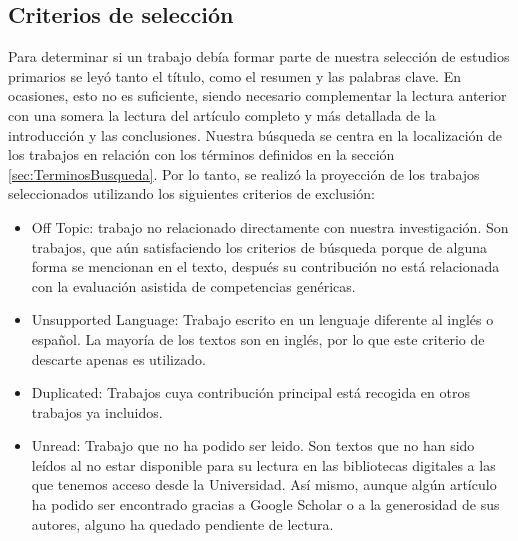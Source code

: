 \subsection{Criterios de selección}
Para determinar si un trabajo debía formar parte de nuestra selección de estudios primarios se leyó tanto el título, como el resumen y las palabras clave. En ocasiones, esto no es suficiente, siendo necesario complementar la lectura anterior con una somera la lectura del artículo completo y más detallada de la introducción y las conclusiones.
Nuestra búsqueda se centra en la localización de los trabajos en relación con los términos definidos en la sección \ref{sec:TerminosBusqueda}. Por lo tanto, se realizó la proyección de los trabajos seleccionados utilizando los siguientes criterios de exclusión:
\begin{itemize}
\item Off Topic: trabajo no relacionado directamente con nuestra investigación. Son trabajos, que aún satisfaciendo los criterios de búsqueda porque de alguna forma se mencionan en el texto, después su contribución no está relacionada con la evaluación asistida de competencias genéricas.
\item Unsupported Language: Trabajo escrito en un lenguaje diferente al inglés o español. La mayoría de los textos son en inglés, por lo que este criterio de descarte apenas es utilizado.
\item Duplicated: Trabajos cuya contribución principal está recogida en otros trabajos ya incluidos. 
\item Unread: Trabajo que no ha podido ser leido. Son textos que no han sido leídos al no estar disponible para su lectura en las bibliotecas digitales a las que tenemos acceso desde la Universidad. Así mismo, aunque algún artículo ha podido ser encontrado gracias a Google Scholar o a la generosidad de sus autores, alguno ha quedado pendiente de lectura.
\end{itemize}


